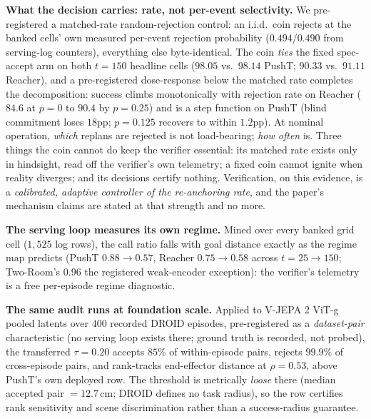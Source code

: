 \documentclass{article}
\begin{document}
\textbf{What the decision carries: rate, not per-event selectivity.} We
pre-registered a matched-rate random-rejection control: an i.i.d.\ coin rejects
at the banked cells' own measured per-event rejection probability
($0.494$/$0.490$ from serving-log counters), everything else byte-identical. The coin \emph{ties} the fixed spec-accept arm on both
$t{=}150$ headline cells ($98.05$ vs.\ $98.14$ PushT; $90.33$ vs.\ $91.11$
Reacher), and a pre-registered dose-response below the matched rate completes
the decomposition: success climbs monotonically with rejection rate on Reacher
($84.6$ at $p{=}0$ to $90.4$ by $p{=}0.25$) and is a step function on PushT
(blind commitment loses $18$pp; $p{=}0.125$ recovers to within $1.2$pp). At
nominal operation, \emph{which} replans are rejected is not load-bearing;
\emph{how often} is. Three things the coin cannot do keep the verifier
essential: its matched rate exists only in hindsight, read off the verifier's
own telemetry; a fixed coin cannot ignite when reality diverges; and its
decisions certify nothing. Verification, on this evidence, is a
\emph{calibrated, adaptive controller of the re-anchoring rate}, and the
paper's mechanism claims are stated at that strength and no more.

\textbf{The serving loop measures its own regime.} Mined over every banked grid
cell ($1{,}525$ log rows), the call ratio falls with goal distance exactly as
the regime map predicts (PushT $0.88\to0.57$, Reacher $0.75\to0.58$ across
$t{=}25\to150$; Two-Room's $0.96$ the registered weak-encoder exception): the
verifier's telemetry is a free per-episode regime diagnostic.

\textbf{The same audit runs at foundation scale.} Applied to V-JEPA 2 ViT-g
pooled latents over $400$ recorded DROID episodes, pre-registered as a
\emph{dataset-pair} characteristic (no serving loop exists there; ground truth
is recorded, not probed), the transferred $\tau{=}0.20$ accepts $85\%$ of
within-episode pairs, rejects $99.9\%$ of cross-episode pairs, and rank-tracks
end-effector distance at $\rho=0.53$, above PushT's own deployed row. The
threshold is metrically \emph{loose} there (median accepted pair $=12.7$\,cm;
DROID defines no task radius), so the row certifies rank sensitivity and
scene discrimination rather than a success-radius guarantee.
\end{document}
